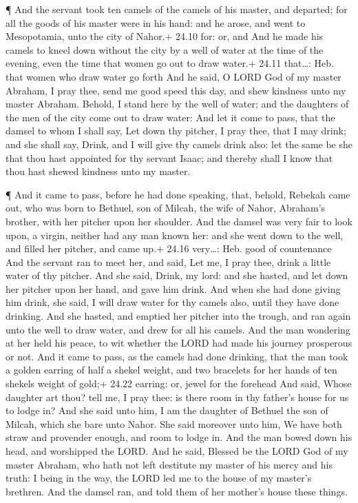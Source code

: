  ¶ And the servant took ten camels of the camels of his
master, and departed; for all the goods of his master were in his hand:
and he arose, and went to Mesopotamia, unto the city of Nahor.+ 24.10
for: or, and  And he made his camels to kneel down without
the city by a well of water at the time of the evening, even the time
that women go out to draw water.+ 24.11 that\ldots: Heb. that women who
draw water go forth  And he said, O LORD God of my master
Abraham, I pray thee, send me good speed this day, and shew kindness
unto my master Abraham.  Behold, I stand here by the well
of water; and the daughters of the men of the city come out to draw
water:  And let it come to pass, that the damsel to whom I
shall say, Let down thy pitcher, I pray thee, that I may drink; and she
shall say, Drink, and I will give thy camels drink also: let the same be
she that thou hast appointed for thy servant Isaac; and thereby shall I
know that thou hast shewed kindness unto my master.

 ¶ And it came to pass, before he had done speaking, that,
behold, Rebekah came out, who was born to Bethuel, son of Milcah, the
wife of Nahor, Abraham's brother, with her pitcher upon her shoulder.
 And the damsel was very fair to look upon, a virgin,
neither had any man known her: and she went down to the well, and filled
her pitcher, and came up.+ 24.16 very\ldots: Heb. good of countenance
 And the servant ran to meet her, and said, Let me, I pray
thee, drink a little water of thy pitcher.  And she said,
Drink, my lord: and she hasted, and let down her pitcher upon her hand,
and gave him drink.  And when she had done giving him
drink, she said, I will draw water for thy camels also, until they have
done drinking.  And she hasted, and emptied her pitcher
into the trough, and ran again unto the well to draw water, and drew for
all his camels.  And the man wondering at her held his
peace, to wit whether the LORD had made his journey prosperous or not.
 And it came to pass, as the camels had done drinking, that
the man took a golden earring of half a shekel weight, and two bracelets
for her hands of ten shekels weight of gold;+ 24.22 earring: or, jewel
for the forehead  And said, Whose daughter art thou? tell
me, I pray thee: is there room in thy father's house for us to lodge in?
 And she said unto him, I am the daughter of Bethuel the
son of Milcah, which she bare unto Nahor.  She said
moreover unto him, We have both straw and provender enough, and room to
lodge in.  And the man bowed down his head, and worshipped
the LORD.  And he said, Blessed be the LORD God of my
master Abraham, who hath not left destitute my master of his mercy and
his truth: I being in the way, the LORD led me to the house of my
master's brethren.  And the damsel ran, and told them of
her mother's house these things.

